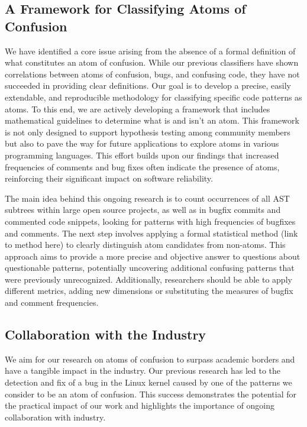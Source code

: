 \documentclass[conference]{IEEEtran}
\begin{document}
\subsection{A Framework for Classifying Atoms of Confusion}

We have identified a core issue arising from the absence of a 
formal definition of what constitutes an atom of confusion. 
While our previous classifiers \cite{gopstein2018prevalence} 
have shown correlations between atoms of confusion, bugs, and 
confusing code, they have not succeeded in providing clear 
definitions. Our goal is to develop a precise, easily 
extendable, and reproducible methodology for classifying 
specific code patterns as atoms. To this end, we are actively 
developing a framework that includes mathematical guidelines 
to determine what is and isn't an atom. This framework is not 
only designed to support hypothesis testing among community 
members but also to pave the way for future applications to 
explore atoms in various programming languages. This effort 
builds upon our findings that increased frequencies of 
comments and bug fixes often indicate the presence of atoms, 
reinforcing their significant impact on software reliability.

The main idea behind this ongoing research is to count 
occurrences of all AST subtrees within large open source 
projects, as well as in bugfix commits and commented code 
snippets, looking for patterns with high frequencies of 
bugfixes and comments. The next step involves applying a 
formal statistical method (link to method here)  to clearly 
distinguish atom candidates from non-atoms. This approach aims 
to provide a more precise and objective answer to questions 
about questionable patterns, potentially uncovering additional 
confusing patterns that were previously unrecognized. 
Additionally, researchers should be able to apply different 
metrics, adding new dimensions or substituting the measures of 
bugfix and comment frequencies.


\subsection{Collaboration with the Industry}

We aim for our research on atoms of confusion to surpass 
academic borders and have a tangible impact in the industry. 
Our previous research has led to the detection and fix of a 
bug in the Linux kernel caused by one of the patterns we 
consider to be an atom of confusion.  This success demonstrates 
the potential for the practical impact of our work and 
highlights the importance of ongoing collaboration with 
industry.
\end{document}
